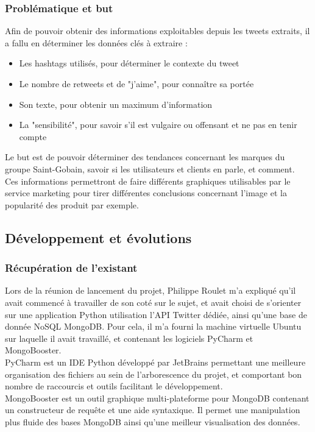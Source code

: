 \documentclass[a4paper,12pt]{article}
\begin{document}
\subsubsection{Problématique et but}
Afin de pouvoir obtenir des informations exploitables depuis les tweets extraits, il a fallu en déterminer les données clés à extraire :
\begin{itemize}
    \item Les hashtags utilisés, pour déterminer le contexte du tweet
    \item Le nombre de retweets et de "j'aime", pour connaître sa portée
    \item Son texte, pour obtenir un maximum d'information
    \item La "sensibilité", pour savoir s'il est vulgaire ou offensant et ne pas en tenir compte
\end{itemize}
Le but est de pouvoir déterminer des tendances concernant les marques du groupe Saint-Gobain, savoir si les utilisateurs et clients en parle, et comment. \\
Ces informations permettront de faire différents graphiques utilisables par le service marketing pour tirer différentes conclusions concernant l'image et la popularité des produit par exemple.


\subsection{Développement et évolutions}
\subsubsection{Récupération de l'existant}
Lors de la réunion de lancement du projet, Philippe Roulet m'a expliqué qu'il avait commencé à travailler de son coté sur le sujet, et avait choisi de s'orienter sur une application Python utilisation l'API Twitter dédiée, ainsi qu'une base de donnée NoSQL MongoDB. Pour cela, il m'a fourni la machine virtuelle Ubuntu sur laquelle il avait travaillé, et contenant les logiciels PyCharm et MongoBooster.\\

PyCharm est un IDE Python développé par JetBrains permettant une meilleure organisation des fichiers au sein de l'arborescence du projet, et comportant bon nombre de raccourcis et outils facilitant le développement.\\
MongoBooster est un outil graphique multi-plateforme pour MongoDB contenant un constructeur de requête et une aide syntaxique. Il permet une manipulation plus fluide des bases MongoDB ainsi qu'une meilleur visualisation des données. \\
\end{document}
